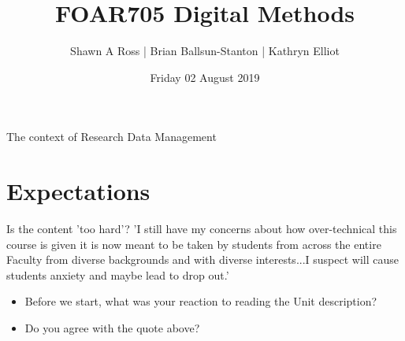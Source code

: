 \documentclass[aspectratio=169, 11pt]{beamer} %
\title{FOAR705 Digital Methods} %
\author{Shawn A Ross | Brian Ballsun-Stanton | Kathryn Elliot}               %
\institute{Faculty of Arts}         %
\date{Friday 02 August 2019}                 %
\begin{document}

\maketitle

  

\begin{frame}{The context of Research Data Management}
  \tableofcontents
\end{frame}

%





\section{Expectations}

\begin{frame}{Is the content 'too hard'?}
 'I still have my concerns about how over-technical this course is given it is now meant to be taken by students from across the entire Faculty from diverse backgrounds and with diverse interests...I suspect will cause students anxiety and maybe lead to drop out.'
    \begin{itemize}[label=\textbullet]
        \item Before we start, what was your reaction to reading the Unit description?
        \item Do you agree with the quote above?
    \end{itemize}
\end{frame}
\end{document}
